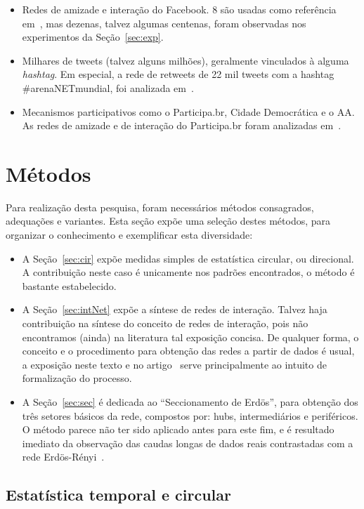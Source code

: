 \documentclass[a4paper,openright,12pt]{report} %
\begin{document}
\begin{itemize}
	\item Redes de amizade e interação do Facebook. 8 são usadas como referência em~\cite{timeS}, mas dezenas, talvez algumas centenas, foram observadas nos experimentos da Seção~\ref{sec:exp}.
	\item Milhares de tweets (talvez alguns milhões), geralmente vinculados à alguma \emph{hashtag}. Em especial, a rede de retweets de 22 mil tweets com a hashtag \#arenaNETmundial, foi analizada em~\cite{timeS}.
	\item Mecanismos participativos como o Participa.br, Cidade Democrática e o AA. As redes de amizade e de interação do Participa.br foram analizadas em~\cite{timeS}.
\end{itemize}

\chapter{Métodos}
Para realização desta pesquisa, foram
necessários métodos consagrados, adequações
e variantes.
Esta seção expõe uma seleção destes métodos,
para organizar o conhecimento
e exemplificar esta diversidade:
\begin{itemize}
	\item A Seção~\ref{sec:cir} expõe medidas simples
de estatística circular, ou direcional.
A contribuição neste caso é unicamente nos
padrões encontrados, o método é bastante estabelecido.
	\item A Seção~\ref{sec:intNet} expõe a síntese de redes
		de interação. Talvez haja contribuição na síntese
		do conceito de redes de interação, pois não 
		encontramos (ainda) na literatura tal exposição
		concisa. De qualquer forma, o conceito e o procedimento
		para obtenção das redes a partir de dados é usual,
		a exposição neste texto e no artigo~\cite{timeS} serve
		principalmente ao intuito de formalização do
		processo.
	\item A Seção~\ref{sec:sec} é dedicada ao ``Seccionamento de Erdös'', para obtenção dos três setores básicos da rede, compostos por: hubs, intermediários e periféricos. O método parece não ter sido aplicado antes para este fim, e é resultado imediato da observação das caudas longas de dados reais contrastadas com a rede Erdös-Rényi~\cite{3setores}.
\end{itemize}


\section{Estatística temporal e circular}
\end{document}
